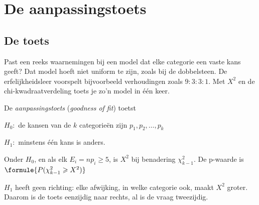 \section{De aanpassingstoets}

\subsection{De toets}

Past een reeks waarnemingen bij een model dat elke categorie een vaste kans geeft? Dat model hoeft niet uniform te zijn, zoals bij de dobbelsteen. De erfelijkheidsleer voorspelt bijvoorbeeld verhoudingen zoals $9 : 3 : 3 : 1$. Met $X^2$ en de chi-kwadraatverdeling toets je zo'n model in één keer.

\begin{theorie}
De \emph{aanpassingstoets} (\textit{goodness of fit}) toetst

\vspace{1mm}
\qquad $H_0\colon$ de kansen van de $k$ categorieën zijn $p_1, p_2, \ldots, p_k$

\qquad $H_1\colon$ minstens één kans is anders.

\vspace{1mm}
Onder $H_0$, en als elk $E_i = n p_i \geqslant 5$, is $X^2$ bij benadering $\chi^2_{k-1}$. De p-waarde is \quad $\formule{P(\chi^2_{k-1} \geqslant X^2)}$
\end{theorie}

$H_1$ heeft geen richting: elke afwijking, in welke categorie ook, maakt $X^2$ groter. Daarom is de toets eenzijdig naar rechts, al is de vraag tweezijdig.


